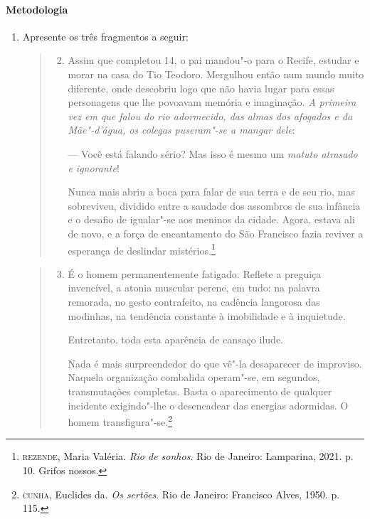 \documentclass[12pt]{extarticle}
\begin{document}
\paragraph{Metodologia}
\begin{enumerate}
\item Apresente os três fragmentos a seguir:

\begin{quote}
\begin{enumerate}
\setcounter{enumii}{1}
\item Assim que completou 14, o pai mandou"-o para o Recife, estudar e
morar na casa do Tio Teodoro. Mergulhou então num mundo muito
diferente, onde descobriu logo que não havia lugar para essas
personagens que lhe povoavam memória e imaginação. \emph{A primeira
vez em que falou do rio adormecido, das almas dos afogados e
da Mãe"-d'água, os colegas puseram"-se a
mangar dele}:

--- Você está falando sério? Mas isso é mesmo um \emph{matuto atrasado
e ignorante}!

Nunca mais abriu a boca para falar de sua terra e de seu rio, mas
sobreviveu, dividido entre a saudade dos assombros de sua infância e
o desafio de igualar"-se aos meninos da cidade. Agora, estava ali de
novo, e a força de encantamento do São Francisco fazia reviver a
esperança de deslindar mistérios.\footnote{\textsc{rezende}, Maria Valéria. \emph{Rio de sonhos}. Rio de Janeiro: Lamparina, 2021. p.\,10. Grifos nossos.}
\end{enumerate}
\end{quote}

\begin{quote}
\begin{enumerate}
\setcounter{enumii}{2}
\item É o homem permanentemente fatigado. Reflete a preguiça invencível, a
atonia muscular perene, em tudo: na palavra remorada, no gesto
contrafeito, na cadência langorosa das modinhas, na tendência
constante à imobilidade e à inquietude.

Entretanto, toda esta aparência de cansaço ilude.

Nada é mais surpreendedor do que vê"-la desaparecer de improviso.
Naquela organização combalida operam"-se, em segundos, transmutações
completas. Basta o aparecimento de qualquer incidente exigindo"-lhe o
desencadear das energias adormidas. O homem transfigura"-se.\footnote{\textsc{cunha}, Euclides da. \emph{Os sertões}. Rio de Janeiro: Francisco Alves, 1950. p.\,115.}
\end{enumerate}
\end{quote}


\end{enumerate}
\end{document}
